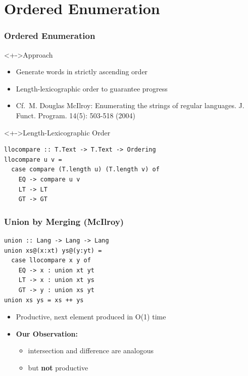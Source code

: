 \documentclass[pdftex,aspectratio=169]{beamer}
\begin{document}
\section{Ordered Enumeration}
\begin{frame}[fragile]
  \frametitle{Ordered Enumeration}
  \vspace{-1.5\baselineskip}
  \begin{block}<+->{Approach}
    \begin{itemize}
    \item Generate words in strictly ascending order
    \item Length-lexicographic order to guarantee progress
    \item Cf.\ M. Douglas McIlroy:
      Enumerating the strings of regular languages. J. Funct. Program. 14(5): 503-518 (2004)
    \end{itemize}
  \end{block}
  \begin{block}<+->{Length-Lexicographic Order}
\begin{lstlisting}[numbers=none]
llocompare :: T.Text -> T.Text -> Ordering
llocompare u v =
  case compare (T.length u) (T.length v) of
    EQ -> compare u v
    LT -> LT
    GT -> GT
\end{lstlisting}
  \end{block}
\end{frame}
\begin{frame}
  \frametitle{Union by Merging (McIlroy)}
\begin{lstlisting}[numbers=none]
union :: Lang -> Lang -> Lang
union xs@(x:xt) ys@(y:yt) =
  case llocompare x y of
    EQ -> x : union xt yt
    LT -> x : union xt ys
    GT -> y : union xs yt
union xs ys = xs ++ ys
\end{lstlisting}
  \begin{itemize}
  \item Productive, next element produced in O(1) time
  \item \textbf{Our Observation:}
    \begin{itemize}
    \item intersection and difference are analogous
    \item but \textbf{not} productive
    \end{itemize}
  \end{itemize}
\end{frame}
\end{document}
